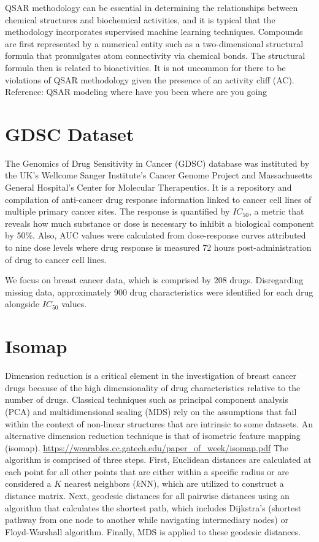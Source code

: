 \documentclass[print]{nuthesis}
\begin{document}
QSAR methodology can be essential in determining the relationships between chemical structures and biochemical activities, and it is typical that the methodology incorporates supervised machine learning techniques. Compounds are first represented by a numerical entity such as a two-dimensional structural formula that promulgates atom connectivity via chemical bonds. The structural formula then is related to bioactivities. It is not uncommon for there to be violations of QSAR methodology given the presence of an activity cliff (AC). Reference: QSAR modeling where have you been where are you going

\hypertarget{gdsc-dataset}{%
\section{GDSC Dataset}\label{gdsc-dataset}}

The Genomics of Drug Sensitivity in Cancer (GDSC) database was instituted by the UK's Wellcome Sanger Institute's Cancer Genome Project and Massachusetts General Hospital's Center for Molecular Therapeutics. It is a repository and compilation of anti-cancer drug response information linked to cancer cell lines of multiple primary cancer sites. The response is quantified by \(IC_\text{50}\), a metric that reveals how much substance or dose is necessary to inhibit a biological component by 50\%. Also, AUC values were calculated from dose-response curves attributed to nine dose levels where drug response is measured 72 hours post-administration of drug to cancer cell lines.

We focus on breast cancer data, which is comprised by 208 drugs. Disregarding missing data, approximately 900 drug characteristics were identified for each drug alongside \(IC_\text{50}\) values.

\hypertarget{isomap}{%
\section{Isomap}\label{isomap}}

Dimension reduction is a critical element in the investigation of breast cancer drugs because of the high dimensionality of drug characteristics relative to the number of drugs. Classical techniques such as principal component analysis (PCA) and multidimensional scaling (MDS) rely on the assumptions that fail within the context of non-linear structures that are intrinsic to some datasets. An alternative dimension reduction technique is that of isometric feature mapping (isomap). \url{https://wearables.cc.gatech.edu/paper_of_week/isomap.pdf} The algorithm is comprised of three steps. First, Euclidean distances are calculated at each point for all other points that are either within a specific radius or are considered a \(K\) nearest neighbors (\(k\)NN), which are utilized to construct a distance matrix. Next, geodesic distances for all pairwise distances using an algorithm that calculates the shortest path, which includes Dijkstra's (shortest pathway from one node to another while navigating intermediary nodes) or Floyd-Warshall algorithm. Finally, MDS is applied to these geodesic distances.
\end{document}
